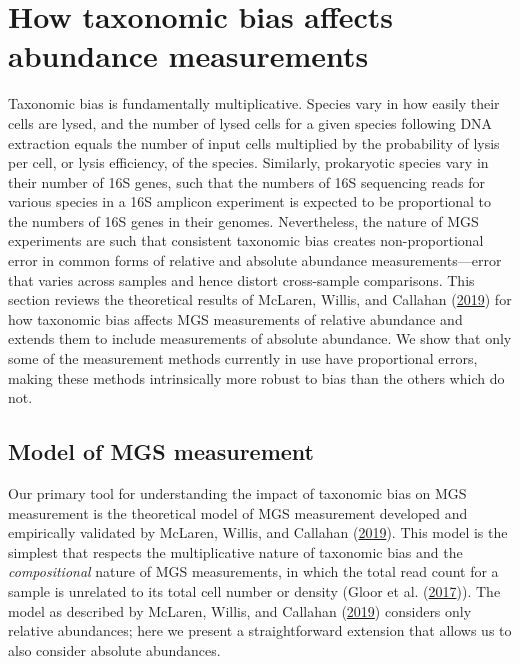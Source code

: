 \documentclass[
]{article}
\begin{document}
\hypertarget{abundance-measurement}{%
\section{How taxonomic bias affects abundance measurements}\label{abundance-measurement}}

Taxonomic bias is fundamentally multiplicative.
Species vary in how easily their cells are lysed, and the number of lysed cells for a given species following DNA extraction equals the number of input cells multiplied by the probability of lysis per cell, or lysis efficiency, of the species.
Similarly, prokaryotic species vary in their number of 16S genes, such that the numbers of 16S sequencing reads for various species in a 16S amplicon experiment is expected to be proportional to the numbers of 16S genes in their genomes.
Nevertheless, the nature of MGS experiments are such that consistent taxonomic bias creates non-proportional error in common forms of relative and absolute abundance measurements---error that varies across samples and hence distort cross-sample comparisons.
This section reviews the theoretical results of McLaren, Willis, and Callahan (\protect\hyperlink{ref-mclaren2019cons}{2019}) for how taxonomic bias affects MGS measurements of relative abundance and extends them to include measurements of absolute abundance.
We show that only some of the measurement methods currently in use have proportional errors, making these methods intrinsically more robust to bias than the others which do not.

\hypertarget{model-of-mgs-measurement}{%
\subsection{Model of MGS measurement}\label{model-of-mgs-measurement}}

Our primary tool for understanding the impact of taxonomic bias on MGS measurement is the theoretical model of MGS measurement developed and empirically validated by McLaren, Willis, and Callahan (\protect\hyperlink{ref-mclaren2019cons}{2019}).
This model is the simplest that respects the multiplicative nature of taxonomic bias and the \emph{compositional} nature of MGS measurements, in which the total read count for a sample is unrelated to its total cell number or density (Gloor et al. (\protect\hyperlink{ref-gloor2017micr}{2017})).
The model as described by McLaren, Willis, and Callahan (\protect\hyperlink{ref-mclaren2019cons}{2019}) considers only relative abundances; here we present a straightforward extension that allows us to also consider absolute abundances.
\end{document}
